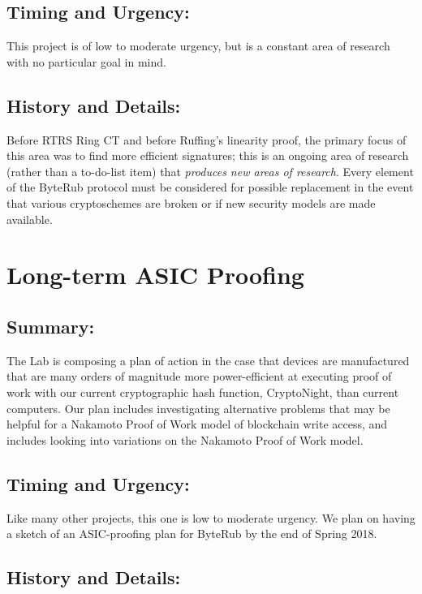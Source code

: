 \documentclass[12pt,english]{mrl}
\theoremstyle{definition}
\numberwithin{equation}{section}
\numberwithin{figure}{section}
\numberwithin{equation}{section}
\numberwithin{equation}{section}
\numberwithin{figure}{section}
\begin{document}
\subsection{Timing and Urgency:} 

This project is of low to moderate urgency, but is a constant area of research with no particular goal in mind. 

\subsection{History and Details:} 

Before RTRS Ring CT and before Ruffing's linearity proof, the primary focus of this area was to find more efficient signatures; this is an ongoing area of research (rather than a to-do-list item) that \textit{produces new areas of research}. Every element of the ByteRub protocol must be considered for possible replacement in the event that various cryptoschemes are broken or if new security models are made available. 
 
 
\section{Long-term ASIC Proofing}

\subsection{Summary:}

The Lab is composing a plan of action in the case that devices are manufactured that are many orders of magnitude more power-efficient at executing proof of work with our current cryptographic hash function, CryptoNight, than current computers. Our plan includes investigating alternative problems that may be helpful for a Nakamoto Proof of Work model of blockchain write access, and includes looking into variations on the Nakamoto Proof of Work model.

\subsection{Timing and Urgency:}

Like many other projects, this one is low to moderate urgency. We plan on having a sketch of an ASIC-proofing plan for ByteRub by the end of Spring 2018.

\subsection{History and Details:}
\end{document}
